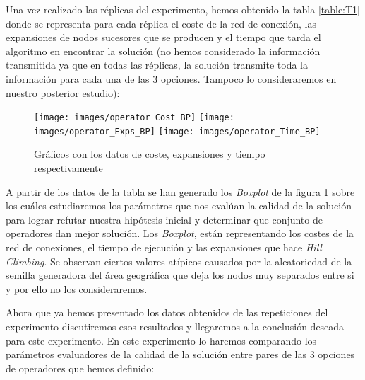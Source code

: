 \documentclass{article}
\begin{document}
\begin{enumerate}
  Una vez realizado las réplicas del experimento, hemos obtenido la tabla \ref{table:T1} donde se representa para cada réplica el coste de la red de conexión, las expansiones de nodos sucesores que se producen y el tiempo que tarda el algoritmo en encontrar la solución (no hemos considerado la información transmitida ya que en todas las réplicas, la solución transmite toda la información para cada una de las 3 opciones. Tampoco lo consideraremos en nuestro posterior estudio):

  \begin{figure}[ht]
    \centering
    \texttt{[image: images/operator\_Cost\_BP]}\hfill
    \texttt{[image: images/operator\_Exps\_BP]}\hfill
    \texttt{[image: images/operator\_Time\_BP]}
    \caption{Gráficos con los datos de coste, expansiones y tiempo respectivamente}
    \label{fig:BP1}
  \end{figure}

  A partir de los datos de la tabla se han generado los \textit{Boxplot} de la figura \ref{fig:BP1} sobre los cuáles estudiaremos los parámetros que nos evalúan la calidad de la solución para lograr refutar nuestra hipótesis inicial y determinar que conjunto de operadores dan mejor solución. Los \textit{Boxplot}, están representando los costes de la red de conexiones, el tiempo de ejecución y las expansiones que hace \textit{Hill Climbing}. Se observan ciertos valores atípicos causados por la aleatoriedad de la semilla generadora del área geográfica que deja los nodos muy separados entre si y por ello no los consideraremos.

  Ahora que ya hemos presentado los datos obtenidos de las repeticiones del experimento discutiremos esos resultados y llegaremos a la conclusión deseada para este experimento. En este experimento lo haremos comparando los parámetros evaluadores de la calidad de la solución entre pares de las 3 opciones de operadores que hemos definido:


\end{enumerate}
\end{document}
